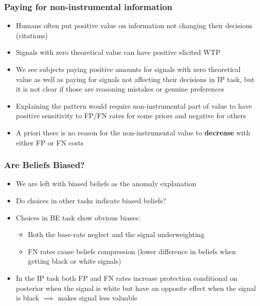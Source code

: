\documentclass[11pt,hyperref={bookmarks=false}]{beamer}
\begin{document}
\begin{frame}
\frametitle{Paying for non-instrumental information}
\begin{itemize}
\item Humans often put positive value on information not changing their decisions (citations)
\item Signals with zero theoretical value can have positive elicited WTP
\item We see subjects paying positive amounts for signals with zero theoretical value as well as paying for signals not affecting their decisions in IP task, but it is not clear if those are reasoning mistakes or genuine preferences
\item Explaining the pattern would require non-instrumental part of value to have positive sensitivity to FP/FN rates for some priors and negative for others
\item A priori there is no reason for the non-instrumental value to \textbf{decrease} with either FP or FN costs
\end{itemize}
\end{frame}


\begin{frame}
\frametitle{Are Beliefs Biased?}
\begin{itemize}
\item We are left with biased beliefs as the anomaly explanation
\item Do choices in other tasks indicate biased beliefs?
\item Choices in BE task show obvious biases:
\begin{itemize}
\item Both the base-rate neglect and the signal underweighting
\item FN rates cause beliefs compression (lower difference in beliefs when getting black or white signals)
\end{itemize}
\item In the IP task both FP and FN rates increase protection conditional on posterior when the signal is white but have an opposite effect when the signal is black $\implies$ makes signal less valuable
\end{itemize}
\end{frame}
\end{document}
